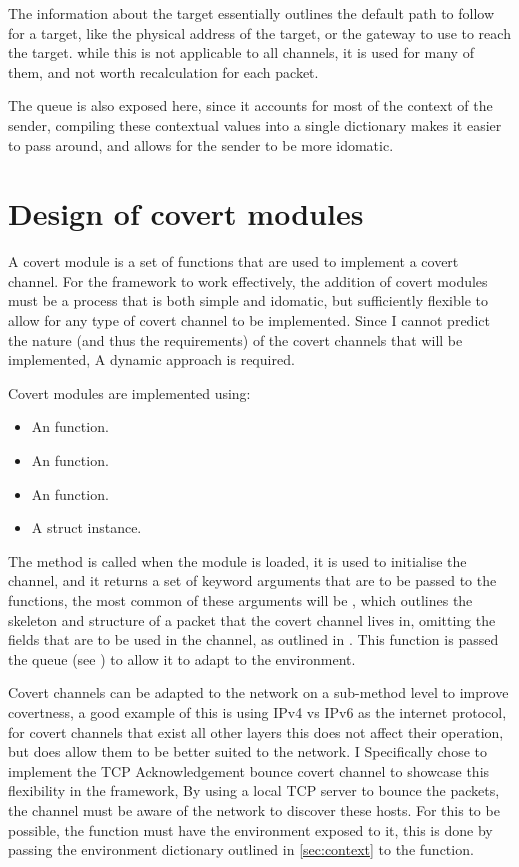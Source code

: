 The information about the target essentially outlines the default path to follow for a target, like the physical address of the target, or the gateway to use to reach the target. while this is not applicable to all channels, it is used for many of them, and not worth recalculation for each packet.

The queue is also exposed here, since it accounts for most of the context of the sender, compiling these contextual values into a single dictionary makes it easier to pass around, and allows for the sender to be more idomatic.

\section{Design of covert modules}
\label{sec:covert_modules}

A covert module is a set of functions that are used to implement a covert channel. For the framework to work effectively, the addition of covert modules must be a process that is both simple and idomatic, but sufficiently flexible to allow for any type of covert channel to be implemented. Since I cannot predict the nature (and thus the requirements) of the covert channels that will be implemented, A dynamic approach is required.

Covert modules are implemented using:
\begin{itemize}
    \item An  function.
    \item An  function.
    \item An  function.
    \item A  struct instance.
\end{itemize}

The  method is called when the module is loaded, it is used to initialise the channel, and it returns a set of keyword arguments that are to be passed to the  functions, the most common of these arguments will be , which outlines the skeleton and structure of a packet that the covert channel lives in, omitting the fields that are to be used in the channel, as outlined in . This function is passed the queue (see ) to allow it to adapt to the environment.

Covert channels can be adapted to the network on a sub-method level to improve covertness, a good example of this is using IPv4 vs IPv6 as the internet protocol, for covert channels that exist all other layers this does not affect their operation, but does allow them to be better suited to the network. I Specifically chose to implement the TCP Acknowledgement bounce covert channel to showcase this flexibility in the framework, By using a local TCP server to bounce the packets, the channel must be aware of the network to discover these hosts. For this to be possible, the  function must have the environment exposed to it, this is done by passing the environment dictionary outlined in \ref{sec:context} to the  function.


